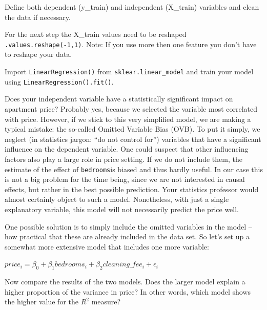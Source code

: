 \documentclass[
  11pt,
]{article}
\newenvironment{tipsp}[1]
  {
  \begin{itemize}
  \footnotesize
  \renewcommand{\labelitemi}{
    \raisebox{-.7\height}[0pt][0pt]{
      {\setkeys{Gin}{width=3em,keepaspectratio}
        \texttt{[image: images/\#1.png]}}
    }
  }
  \setlength{\fboxsep}{1em}
  \begin{pbox}
  \item
  }
  {
  \end{pbox}
  \end{itemize}
  }
\begin{document}
\begin{tipsp}p

Define both dependent (y\_train) and independent (X\_train) variables and clean the data if necessary.

For the next step the X\_train values need to be reshaped \texttt{.values.reshape(-1,1)}.
Note: If you use more then one feature you don't have to reshape your data.

Import \texttt{LinearRegression()} from \texttt{sklear.linear\_model} and train your model using \texttt{LinearRegression().fit()}.

\end{tipsp}

Does your independent variable have a statistically significant impact on apartment price? Probably yes, because we selected the variable most correlated with price. However, if we stick to this very simplified model, we are making a typical mistake: the so-called Omitted Variable Bias (OVB). To put it simply, we neglect (in statistics jargon: ``do not control for'') variables that have a significant influence on the dependent variable. One could suspect that other influencing factors also play a large role in price setting. If we do not include them, the estimate of the effect of \texttt{bedrooms}is biased and thus hardly useful. In our case this is not a big problem for the time being, since we are not interested in causal effects, but rather in the best possible prediction. Your statistics professor would almost certainly object to such a model. Nonetheless, with just a single explanatory variable, this model will not necessarily predict the price well.

One possible solution is to simply include the omitted variables in the model -- how practical that these are already included in the data set. So let's set up a somewhat more extensive model that includes one more variable:

\(price_i = \beta_0 + \beta_1 bedrooms_i + \beta_2 cleaning\_fee_i + \epsilon_i\)

Now compare the results of the two models. Does the larger model explain a higher proportion of the variance in price? In other words, which model shows the higher value for the \(R^2\) measure?
\end{document}
